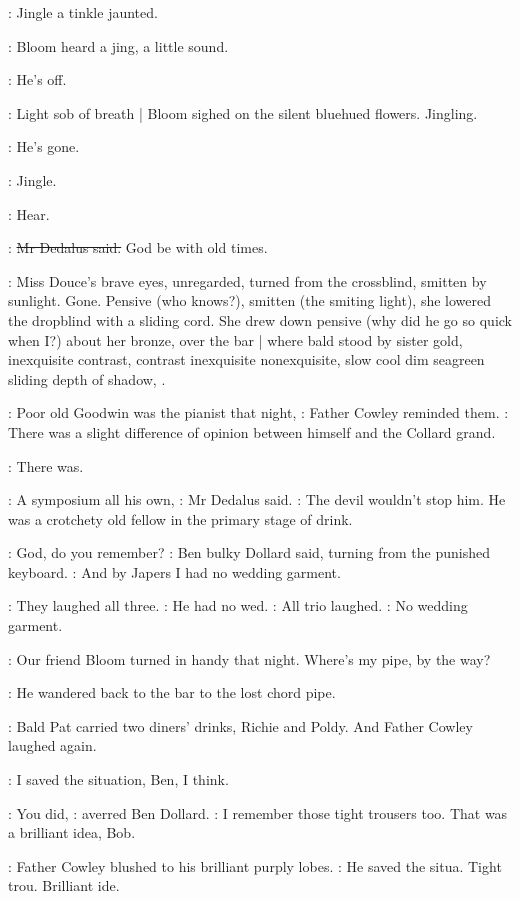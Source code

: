 :
Jingle a tinkle jaunted.

:
Bloom heard a jing, a little sound.

\BloomInt:
He's off.

:
Light sob of breath |
Bloom sighed on the silent bluehued flowers.
Jingling.

\BloomInt:
He's gone.

:
Jingle.

\BloomInt:
Hear.

\simon:
\sout{Mr Dedalus said.}
God be with old times.

:
Miss Douce's brave eyes, unregarded,
turned from the crossblind,
smitten by sunlight.
Gone.
Pensive (who knows?),
smitten (the smiting light),
she lowered the dropblind with a sliding cord.
She drew down pensive
(why did he go so quick when I?)
about her bronze,
over the bar |
where bald stood by sister gold,
inexquisite contrast,
contrast inexquisite nonexquisite,
slow cool dim seagreen sliding depth of shadow,
.

\cowley:
Poor old Goodwin was the pianist that night,
:
Father Cowley reminded them.
\cowley:
There was a slight difference of opinion between himself and the
Collard grand.

:
There was.

\simon:
A symposium all his own,
:
Mr Dedalus said.
\simon:
The devil wouldn't stop him.
He was a crotchety old fellow in the primary stage of drink.

\dollard:
God, do you remember?
:
Ben bulky Dollard said, turning from the punished keyboard.
\dollard:
And by Japers I had no wedding garment.

:
They laughed all three.
\simon:
He had no wed.
:
All trio laughed.
\dollard:
No wedding garment.

\simon:
Our friend Bloom turned in handy that night. Where's
my pipe, by the way?

:
He wandered back to the bar to the lost chord pipe.

:
Bald Pat carried
two diners' drinks, Richie and Poldy. And Father Cowley laughed again.

\cowley:
I saved the situation,
Ben, I think.

\dollard:
You did,
:
averred Ben Dollard.
\dollard:
I remember those tight trousers too.
That was a brilliant idea, Bob.

:
Father Cowley blushed to his brilliant purply lobes.
\cowley:
He saved the
situa. Tight trou. Brilliant ide.

